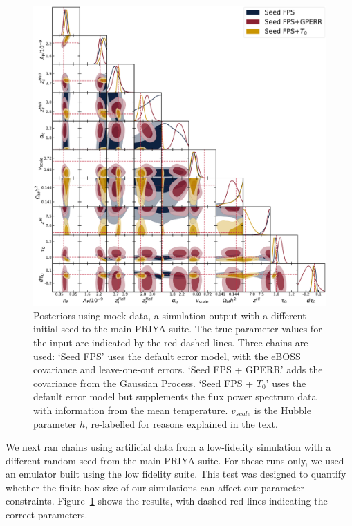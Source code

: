 \begin{figure}
    \centering
    \includegraphics[width=\textwidth]{figures/simdat-seed.pdf}
    \caption{\label{fig:simdat_posteriors}
    Posteriors using mock data, a simulation output with a different initial seed to the main PRIYA suite.
    The true parameter values for the input are indicated by the red dashed lines. Three chains are used: `Seed FPS' uses the default error model, with the eBOSS covariance and leave-one-out errors. `Seed FPS + GPERR' adds the covariance from the Gaussian Process. `Seed FPS + $T_0$' uses the default error model but supplements the flux power spectrum data with information from the mean temperature. $v_{scale}$ is the Hubble parameter $h$, re-labelled for reasons explained in the text.}
\end{figure}

We next ran chains using artificial data from a low-fidelity simulation with a different random seed from the main PRIYA suite. For these runs only, we used an emulator built using the low fidelity suite. This test was designed to quantify whether the finite box size of our simulations can affect our parameter constraints. Figure~\ref{fig:simdat_posteriors} shows the results, with dashed red lines indicating the correct parameters.

